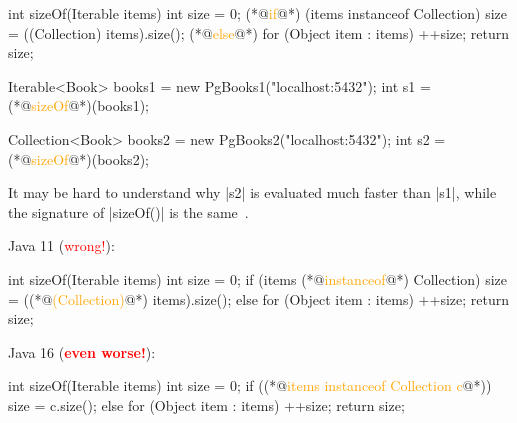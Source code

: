 \documentclass{article}
\begin{document}
\begin{pptWide}{2}
{\small\begin{ffcode}
int sizeOf(Iterable items) {
  int size = 0;
  (*@\textcolor{orange}{if}@*) (items instanceof Collection) {
    size = ((Collection) items).size();
  } (*@\textcolor{orange}{else}@*) {
    for (Object item : items) {
      ++size;
    }
  }
  return size;
}
\end{ffcode}
}
\par\columnbreak\par
{\small\begin{ffcode}
Iterable<Book> books1 =
  new PgBooks1("localhost:5432");
int s1 = (*@\textcolor{orange}{sizeOf}@*)(books1);

Collection<Book> books2 =
  new PgBooks2("localhost:5432");
int s2 = (*@\textcolor{orange}{sizeOf}@*)(books2);
\end{ffcode}
}
\end{pptWide}
\par
It may be hard to understand why |s2| is evaluated much faster than |s1|,
while the signature of |sizeOf()| is the same~\citep{bugayenko2015blog0402}.
\plush{}

%
\begin{pptWide}{2}%
Java 11 (\textcolor{red}{wrong!}):
\par
{\small\begin{ffcode}
int sizeOf(Iterable items) {
  int size = 0;
  if (items (*@\textcolor{orange}{instanceof}@*) Collection) {
    size = ((*@\textcolor{orange}{(Collection)}@*) items).size();
  } else {
    for (Object item : items) {
      ++size;
    }
  }
  return size;
}
\end{ffcode}
}
\par\columnbreak\par
{}%
Java 16 (\textcolor{red}{\textbf{even worse!}}):
\par
{\small\begin{ffcode}
int sizeOf(Iterable items) {
  int size = 0;
  if ((*@\textcolor{orange}{items instanceof Collection c}@*)) {
    size = c.size();
  } else {
    for (Object item : items) {
      ++size;
    }
  }
  return size;
}
\end{ffcode}
}
\end{pptWide}
\par
\plush{}
\end{document}
